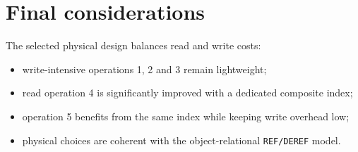 \section{Final considerations}

The selected physical design balances read and write costs:

\begin{itemize}
    \item write-intensive operations 1, 2 and 3 remain lightweight;
    \item read operation 4 is significantly improved with a dedicated composite index;
    \item operation 5 benefits from the same index while keeping write overhead low;
    \item physical choices are coherent with the object-relational \texttt{REF/DEREF} model.
\end{itemize}



